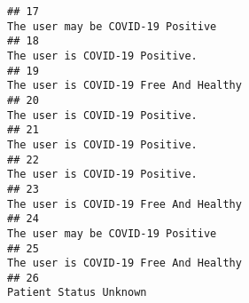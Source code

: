 \documentclass[
]{article}
\begin{document}
\begin{verbatim}
## 17                                                                                                                                                                                                                                   The user may be COVID-19 Positive
## 18                                                                                                                                                                                                                                      The user is COVID-19 Positive.
## 19                                                                                                                                                                                                                               The user is COVID-19 Free And Healthy
## 20                                                                                                                                                                                                                                      The user is COVID-19 Positive.
## 21                                                                                                                                                                                                                                      The user is COVID-19 Positive.
## 22                                                                                                                                                                                                                                      The user is COVID-19 Positive.
## 23                                                                                                                                                                                                                               The user is COVID-19 Free And Healthy
## 24                                                                                                                                                                                                                                   The user may be COVID-19 Positive
## 25                                                                                                                                                                                                                               The user is COVID-19 Free And Healthy
## 26                                                                                                                                                                                                                                              Patient Status Unknown

\end{verbatim}
\end{document}

